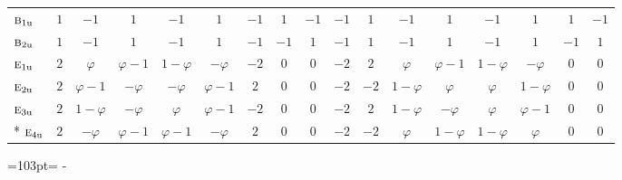 \documentclass[10pt,a4paper]{article}
\newcommand{\needspace}[1]{\par\penalty-100\begingroup\dimen0=#1\relax\dimen2=\pagegoal
  \advance\dimen2-\pagetotal\ifdim\dimen0>\dimen2\relax\ifdim\dimen2>0pt\vfil\break\fi\fi
  \endgroup}
\numberwithin{equation}{section}
\newcommand{\irr}[1]{\text{\normalfont\scshape #1}}
\newcommand{\ptag}[1]{\mathrm{#1}}
\newcommand{\goldenratio}{\varphi}
\begin{document}
{\begin{longtable}{@{}lcccccccccccccccc@{}}
$\irr{b}_{1\ptag{u}}$ & $1$ & $-1$ & $1$ & $-1$ & $1$ & $-1$ & $1$ & $-1$ & $-1$ & $1$ & $-1$ & $1$ & $-1$ & $1$ & $1$ & $-1$\\
$\irr{b}_{2\ptag{u}}$ & $1$ & $-1$ & $1$ & $-1$ & $1$ & $-1$ & $-1$ & $1$ & $-1$ & $1$ & $-1$ & $1$ & $-1$ & $1$ & $-1$ & $1$\\
$\irr{e}_{1\ptag{u}}$ & $2$ & $\goldenratio{}$ & $\goldenratio - 1$ & $1 - \goldenratio{}$ & $-\goldenratio{}$ & $-2$ & $0$ & $0$ & $-2$ & $2$ & $\goldenratio{}$ & $\goldenratio - 1$ & $1 - \goldenratio{}$ & $-\goldenratio{}$ & $0$ & $0$\\
$\irr{e}_{2\ptag{u}}$ & $2$ & $\goldenratio - 1$ & $-\goldenratio{}$ & $-\goldenratio{}$ & $\goldenratio - 1$ & $2$ & $0$ & $0$ & $-2$ & $-2$ & $1 - \goldenratio{}$ & $\goldenratio{}$ & $\goldenratio{}$ & $1 - \goldenratio{}$ & $0$ & $0$\\
$\irr{e}_{3\ptag{u}}$ & $2$ & $1 - \goldenratio{}$ & $-\goldenratio{}$ & $\goldenratio{}$ & $\goldenratio - 1$ & $-2$ & $0$ & $0$ & $-2$ & $2$ & $1 - \goldenratio{}$ & $-\goldenratio{}$ & $\goldenratio{}$ & $\goldenratio - 1$ & $0$ & $0$\\*
$\irr{e}_{4\ptag{u}}$ & $2$ & $-\goldenratio{}$ & $\goldenratio - 1$ & $\goldenratio - 1$ & $-\goldenratio{}$ & $2$ & $0$ & $0$ & $-2$ & $-2$ & $\goldenratio{}$ & $1 - \goldenratio{}$ & $1 - \goldenratio{}$ & $\goldenratio{}$ & $0$ & $0$\\
\bottomrule\end{longtable}}
\needspace{103pt}
\end{document}
